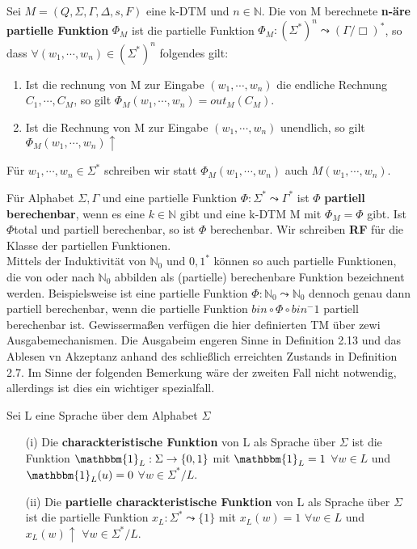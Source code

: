  Sei $M = (Q, \Sigma, \Gamma, \Delta, s, F)$ eine k-DTM und $n \in \mathbb{N}$. Die von M berechnete \textbf{n-äre partielle Funktion} $\Phi_M$ ist die partielle Funktion $\Phi_M : (\Sigma^*)^n \leadsto (\Gamma / {\Box})^*$, so dass $\forall (w_1, \cdots, w_n) \in (\Sigma^*)^n$ folgendes gilt:
\begin{enumerate}
  \item Ist die rechnung von M zur Eingabe $(w_1, \cdots, w_n)$ die endliche Rechnung $C_1, \cdots, C_M$, so gilt $\Phi_M(w_1, \cdots, w_n) = out_M(C_M)$.
  \item Ist die Rechnung von M zur Eingabe $(w_1, \cdots, w_n)$ unendlich, so gilt $\Phi_M(w_1, \cdots, w_n)\uparrow $
\end{enumerate}
Für $w_1, \cdots, w_n \in \Sigma^*$ schreiben wir statt $\Phi_M(w_1, \cdots, w_n)$ auch $M(w_1, \cdots, w_n)$.

Für Alphabet $\Sigma, \Gamma$ und eine partielle Funktion $\Phi : \Sigma^* \leadsto \Gamma^*$ ist $\Phi$ \textbf{partiell berechenbar}, wenn es eine $k \in \mathbb{N}$ gibt und eine k-DTM M mit $\Phi_M = \Phi$ gibt. Ist $\Phi $total und partiell berechenbar, so ist $\Phi$ berechenbar. Wir schreiben \textbf{RF} für die Klasse der partiellen Funktionen.\\Mittels der Induktivität von $\mathbb{N}_0$ und ${0, 1}^*$ können so auch partielle Funktionen, die von oder nach $\mathbb{N}_0$ abbilden als (partielle) berechenbare Funktion bezeichnent werden. Beispielsweise ist eine partielle Funktion $\Phi : \mathbb{N}_0 \leadsto \mathbb{N}_0$ dennoch genau dann partiell berechenbar, wenn die partielle Funktion $bin \circ \Phi \circ bin^-1$ partiell berechenbar ist. Gewissermaßen verfügen die hier definierten TM über zewi Ausgabemechanismen. Die Ausgabeim engeren Sinne in Definition 2.13 und das Ablesen vn Akzeptanz anhand des schließlich erreichten Zustands in Definition 2.7. Im Sinne der folgenden Bemerkung wäre der zweiten Fall nicht notwendig, allerdings ist dies ein wichtiger spezialfall.

 Sei L eine Sprache über dem Alphabet $\Sigma$
\begin{itemize}
  \item [(i)] Die \textbf{charackteristische Funktion} von L als Sprache über $\Sigma$ ist die Funktion $\mathbbm{1}_L : \Sigma \rightarrow \{0, 1\}$ mit $\mathbbm{1}_L = 1$ $\forall w \in L$ und $\mathbbm{1}_L (u) = 0$ $\forall w \in \Sigma^* / L$.
  \item [(ii)] Die \textbf{ partielle charackteristische Funktion} von L als Sprache über $\Sigma$ ist die partielle Funktion $x_L : \Sigma^* \leadsto \{1\}$ mit $x_L(w) = 1$ $\forall w \in L$ und $x_L(w) \uparrow$  $\forall w \in \Sigma^* / L.$ 
\end{itemize}

